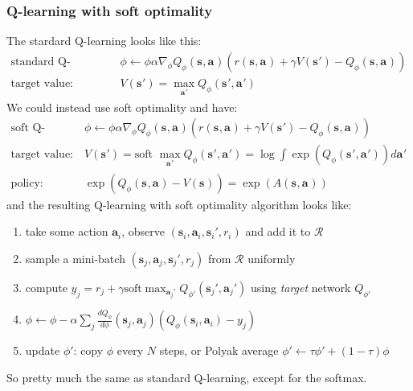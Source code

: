 \documentclass{report}
\begin{document}
\subsubsection{Q-learning with soft optimality}
The stardard Q-learning looks like this:
\begin{align}
\text{standard Q-learning: }& \phi \leftarrow \phi \alpha \nabla_{ \phi } Q_{ \phi } (\bm{s}_{}, \bm{a}_{} )
\left( r (\bm{s}_{}, \bm{a}_{} ) + \gamma V (\bm{s}_{}') - Q_{ \phi } (\bm{s}_{}, \bm{a}_{} ) \right)  \\
\text{target value: } & V (\bm{s}_{}') = \max_{\bm{a}_{}'} Q_{ \phi } (\bm{s}_{}', \bm{a}_{} ')
\end{align}
We could instead use soft optimality and have:
\begin{align}
\text{soft Q-learning: }& \phi \leftarrow \phi \alpha \nabla_{ \phi } Q_{ \phi } (\bm{s}_{}, \bm{a}_{} )
\left( r (\bm{s}_{}, \bm{a}_{} ) + \gamma V (\bm{s}_{}') - Q_{ \phi } (\bm{s}_{}, \bm{a}_{} ) \right)  \\
\text{target value: }& V (\bm{s}_{}') =\text{soft } \max_{\bm{a}_{}'} Q_{ \phi } (\bm{s}_{}', \bm{a}_{} ') = \log \int \exp (Q_{ \phi }(\bm{s}_{}', \bm{a}_{}' )) d\bm{a}_{}'\\
\text{policy: } & \exp (Q_{ \phi }(\bm{s}_{}, \bm{a}_{} ) - V (\bm{s}_{})) = \exp (A(\bm{s}_{}, \bm{a}_{} ))
\end{align}
and the resulting Q-learning with soft optimality algorithm looks like:
\begin{enumerate}
		\item take some action $\bm{a}_i$,  observe $\left( \bm{s}_i, \bm{a}_i, \bm{s}_i', r_i \right)$ and add it to $\mathcal{R}$
		\item sample a mini-batch  $\left( \bm{s}_j, \bm{a}_j, \bm{s}_j', r_j \right)$  from $\mathcal{R}$ uniformly
		\item compute $y_j = r_j + \gamma \text{soft} \max_{\bm{a}_j'} Q_{\phi'} (\bm{s}_{j}', \bm{a}_{j}')$ using \textit{target} network $Q_{\phi'}$
		\item $  \phi \leftarrow \phi  - \alpha \sum_{j}^{}  \frac{d Q_\phi}{d\phi} (\bm{s}_{j}, \bm{a}_{j}) \left( Q_\phi(\bm{s}_{i}, \bm{a}_{i}) - 
				y_j 	\right) $ 
		\item update $\phi'$: copy $\phi$ every $N$ steps, or Polyak average $ \phi' \leftarrow \tau \phi' + (1 - \tau) \phi  $
\end{enumerate}
So pretty much the same as standard Q-learning, except for the softmax.
\end{document}
